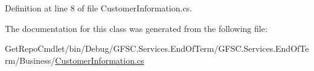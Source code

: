 Definition at line 8 of file Customer\+Information.\+cs.



The documentation for this class was generated from the following file\+:\begin{DoxyCompactItemize}
\item 
Get\+Repo\+Cmdlet/bin/\+Debug/\+G\+F\+S\+C.\+Services.\+End\+Of\+Term/\+G\+F\+S\+C.\+Services.\+End\+Of\+Term/\+Business/\mbox{\hyperlink{_business_2_customer_information_8cs}{Customer\+Information.\+cs}}\end{DoxyCompactItemize}
